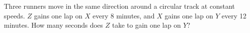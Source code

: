 Three runners move in the same direction around a circular track at constant speeds. $ Z $ gains one lap on $ X $ every 8 minutes, and $ X $ gains one lap on $ Y $ every 12 minutes. How many seconds does $ Z $ take to gain one lap on $ Y $?
